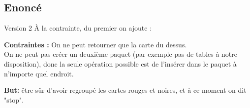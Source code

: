 \documentclass[10pt,french]{article}
\theoremstyle{plain}
\begin{document}
\subsection{Enoncé}
\begin{bclogo}[arrondi = 0,logo = \bcetoile]{Version 2}
   À la contrainte, du premier on ajoute :
   
    
    \textbf{Contraintes :}
    On ne peut retourner que la carte du dessus.\\
    On ne peut pas créer un deuxième paquet (par exemple pas de tables à notre disposition), donc la seule opération possible est de l'insérer dans le paquet à n'importe quel endroit.
    
    \textbf{But: }
        être sûr d'avoir regroupé les cartes rouges et noires, et à ce moment on dit "stop".
\end{bclogo}
\end{document}
